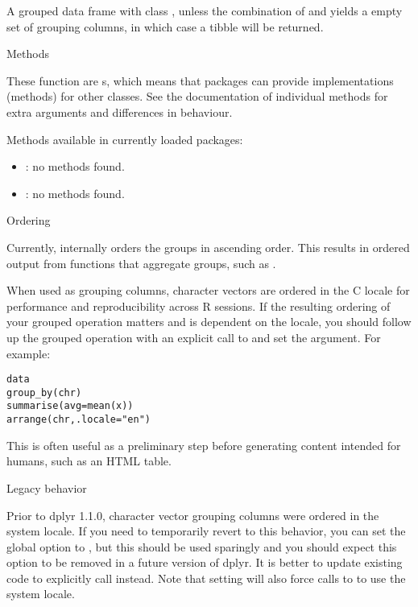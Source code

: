 \documentclass[a4paper]{book}
\begin{document}
%
\begin{Value}
A grouped data frame with class ,
unless the combination of  and  yields a empty set of
grouping columns, in which case a tibble will be returned.
\end{Value}
%
\begin{Section}{Methods}

These function are s, which means that packages can provide
implementations (methods) for other classes. See the documentation of
individual methods for extra arguments and differences in behaviour.

Methods available in currently loaded packages:
\begin{itemize}

\item{} : no methods found.
\item{} : no methods found.

\end{itemize}

\end{Section}
%
\begin{Section}{Ordering}

Currently,  internally orders the groups in ascending order. This
results in ordered output from functions that aggregate groups, such as
.

When used as grouping columns, character vectors are ordered in the C locale
for performance and reproducibility across R sessions. If the resulting
ordering of your grouped operation matters and is dependent on the locale,
you should follow up the grouped operation with an explicit call to
 and set the  argument. For example:

\begin{alltt}data %>%
  group_by(chr) %>%
  summarise(avg = mean(x)) %>%
  arrange(chr, .locale = "en")
\end{alltt}


This is often useful as a preliminary step before generating content intended
for humans, such as an HTML table.
%
\begin{SubSection}{Legacy behavior}

Prior to dplyr 1.1.0, character vector grouping columns were ordered in the
system locale. If you need to temporarily revert to this behavior, you can
set the global option  to , but this should be
used sparingly and you should expect this option to be removed in a future
version of dplyr. It is better to update existing code to explicitly call
 instead. Note that setting  will
also force calls to  to use the system locale.
\end{SubSection}

\end{Section}
\end{document}
